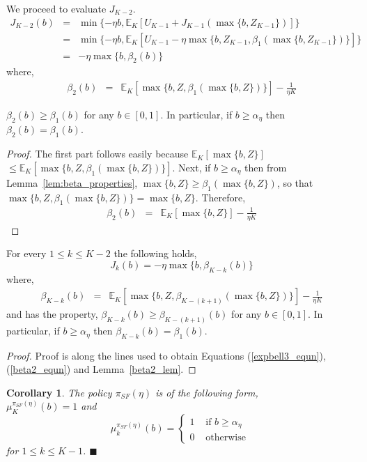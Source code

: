 \documentclass[onecolumn]{IEEEtran}
\newtheorem{corollary}[theorem]{Corollary}
\begin{document}
We proceed  to evaluate $J_{K-2}$.
\begin{eqnarray}
	\label{expbell3_equn}
	J_{K-2}(b)
	&=&\min\{-\eta b,\mathbb{E}_K[U_{K-1}+J_{K-1}(\max\{b,Z_{K-1}\})]\}\nonumber\\
	&=&\min\{-\eta b,\mathbb{E}_K[U_{K-1}-\eta\max\{b,Z_{K-1},
	\beta_1(\max\{b,Z_{K-1}\})\}]\}\nonumber\\
	&=&-\eta\max\{b,\beta_2(b)\}
\end{eqnarray}
where,
\begin{eqnarray}
	\label{beta2_equn}
	\beta_2(b)&=&\mathbb{E}_K[\max\{b,Z,\beta_1(\max\{b,Z\})\}]-\frac{1}{\eta K}
\end{eqnarray}
\begin{lemma}
\label{beta2_lem}
	$\beta_2(b)\ge\beta_1(b)$ for any $b\in[0,1]$. In particular, if $b\ge\alpha_\eta$ then $\beta_2(b)=\beta_1(b)$.
\end{lemma}
\begin{proof}
  The first part follows easily because $\mathbb{E}_K[\max\{b,Z\}]$
  $\le\mathbb{E}_K[\max\{b,Z,\beta_1(\max\{b,Z\})\}]$. 
  Next, if
  $b\ge\alpha_\eta$ then from Lemma~\ref{lem:beta_properties}, 
  $\max\{b,Z\}\ge\beta_1(\max\{b,Z\})$, so that $\max\{b,Z,\beta_1(\max\{b,Z\})\}=\max\{b,Z\}$. Therefore,
	\begin{eqnarray*}
		\beta_2(b)&=&\mathbb{E}_K[\max\{b,Z\}]-\frac{1}{\eta K}
	\end{eqnarray*}
\end{proof}
\begin{lemma}
For every  $1\le k\le K-2$ the following holds,
\begin{equation}
	\label{expbellk_equn}
	J_{k}(b)=-\eta\max\{b,\beta_{K-k}(b)\}
\end{equation}
where, 
\begin{eqnarray}
\label{expbetak_equn}
\beta_{K-k}(b)&=&\mathbb{E}_K[\max\{b,Z,\beta_{K-(k+1)}(\max\{b,Z\})\}]
- \frac{1}{\eta K}\nonumber
\end{eqnarray}
and has the property, $\beta_{K-k}(b)\ge\beta_{K-(k+1)}(b)$ for any $b\in[0,1]$. In particular,
if $b\ge\alpha_{\eta}$ then $\beta_{K-k}(b)=\beta_1(b)$.
\end{lemma}
\begin{proof}
Proof is along the lines  used to obtain Equations (\ref{expbell3_equn}), (\ref{beta2_equn}) and Lemma~\ref{beta2_lem}.
\end{proof}
\vspace{2mm}
\begin{corollary}
The  policy $\pi_{SF}(\eta)$ is of the following form,\\ $\mu^{\pi_{SF}(\eta)}_{K}(b)=1$ and
\begin{equation}
	\label{exppolicy_equn}
	\mu^{\pi_{SF}(\eta)}_k(b)=\left\{\begin{array}{ll}
	                               	1&\mbox{ if }b\ge \alpha_\eta\\
	                               	0&\mbox{ otherwise }	\end{array}\right.
\end{equation}
for $1\le k\le K-1$. 
\hfill $\blacksquare$
\end{corollary}
\end{document}
